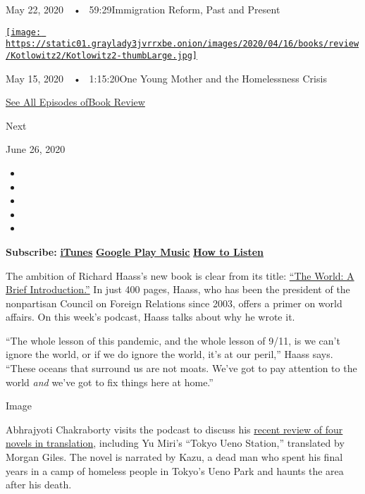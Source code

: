 May 22, 2020~~•~ 59:29Immigration Reform, Past and Present

\href{https://www.nytimes3xbfgragh.onion/2020/05/15/books/review/podcast-lauren-sandler-this-is-all-i-got-sarah-weinman-crime-fiction.html?action=click\&module=audio-series-bar\&region=header\&pgtype=Article}{\texttt{[image: https://static01.graylady3jvrrxbe.onion/images/2020/04/16/books/review/Kotlowitz2/Kotlowitz2-thumbLarge.jpg]}}

May 15, 2020~~•~ 1:15:20One Young Mother and the Homelessness Crisis

\href{https://www.nytimes3xbfgragh.onion/column/book-review-podcast}{See
All Episodes ofBook Review}

Next

June 26, 2020

\begin{itemize}
\item
\item
\item
\item
\item
\end{itemize}

\textbf{Subscribe:}
\textbf{\href{https://itunes.apple.com/us/podcast/book-review/id120315179?mt=2}{iTunes}}
\textbf{\textbar{}}
\textbf{\href{https://play.google.com/music/listen?u=0\#/ps/Iv6zeb5qwjtzjfbyo3vy5zny5ky}{Google
Play Music}} \textbf{\textbar{}}
\textbf{\href{https://www.nytimes3xbfgragh.onion/2018/08/03/books/review/how-to-listen-to-the-book-review-podcast.html}{How
to Listen}}

The ambition of Richard Haass's new book is clear from its title:
\href{https://www.nytimes3xbfgragh.onion/2020/05/12/books/review/the-world-richard-haass.html}{``The
World: A Brief Introduction.''} In just 400 pages, Haass, who has been
the president of the nonpartisan Council on Foreign Relations since
2003, offers a primer on world affairs. On this week's podcast, Haass
talks about why he wrote it.

``The whole lesson of this pandemic, and the whole lesson of 9/11, is we
can't ignore the world, or if we do ignore the world, it's at our
peril,'' Haass says. ``These oceans that surround us are not moats.
We've got to pay attention to the world \emph{and} we've got to fix
things here at home.''

Image

Abhrajyoti Chakraborty visits the podcast to discuss his
\href{https://www.nytimes3xbfgragh.onion/2020/06/23/books/review/miri-alvarez-shibli-appanah.html}{recent
review of four novels in translation}, including Yu Miri's ``Tokyo Ueno
Station,'' translated by Morgan Giles. The novel is narrated by Kazu, a
dead man who spent his final years in a camp of homeless people in
Tokyo's Ueno Park and haunts the area after his death.

